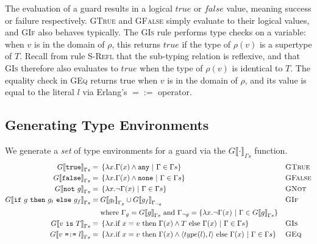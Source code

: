 \documentclass[nonacm,timestamp,manuscript]{acmart}
\newcommand{\atom}[1]{\texttt{#1}}
\newcommand{\singleton}[2]{\langle #1, #2 \rangle} %
\newcommand{\res}[1]{\texttt{#1}}
\begin{document}
The evaluation of a guard results in a logical $true$ or $false$ value, meaning
success or failure respectively. \textsc{GTrue} and \textsc{GFalse} simply
evaluate to their logical values, and \textsc{GIf} also behaves typically.
The \textsc{GIs} rule performs type checks on a variable: when $v$ is in the
domain of $\rho$, this returns $true$ if the type of $\rho(v)$ is a supertype of $T$.
Recall from rule \textsc{S-Refl} that the sub-typing relation is reflexive, and
that \textsc{GIs} therefore also evaluates to $true$ when the type of $\rho(v)$ is
identical to $T$. The equality check in \textsc{GEq} returns true when $v$ is
in the domain of $\rho$, and its value is equal to the literal $l$ via Erlang's
$=:=$ operator.

\subsection{Generating Type Environments}

\newcommand{\Gden}[2][\Gamma{}s]{{G \llbracket{} #2 \rrbracket{}}_{#1}}

\begin{definition}

We generate a \textit{set} of type environments for a guard via the
$\Gden{\cdot}$ function.
\begin{align*}
  \Gden{\res{true}
  } ={}&
         \left\{
         \lambda x . \Gamma(x) \land \atom{any}
         \ \middle|\
         \Gamma \in \Gamma{}s
         \right\}
  && \textsc{GTrue} \\
  \Gden{\res{false}
  } ={}&
         \left\{
         \lambda x . \Gamma(x) \land \atom{none}
         \ \middle|\ 
         \Gamma \in \Gamma{}s
         \right\}
  && \textsc{GFalse} \\
  \Gden{\res{not}\ g
  } ={}&
         \left\{
         \lambda x . \neg \Gamma(x)
         \ \middle|\
         \Gamma \in \Gamma{}s
         \right\}
  && \textsc{GNot} \\
  \Gden{\res{if}\ g\ \res{then}\ g_t\ \res{else}\ g_f
  } ={}& 
         \Gden[\Gamma_g]{g_t} \cup \Gden[\Gamma_{\neg g}]{g_f}
  && \textsc{GIf} \\
       & \text{where}\ \Gamma_g = \Gden{g}\ 
         \text{and}\ \Gamma_{\neg g} = \left\{ \lambda x . \neg \Gamma(x)\ \middle|\ \Gamma \in \Gden{g} \right\} \\
  \Gden{v\ \res{is}\ T
  } ={}&
         \left\{
         \lambda x . \text{if}\ x = v\ \text{then}\ \Gamma(x) \land T\ \text{else}\ \Gamma(x)
         \ \middle|\ 
         \Gamma \in \Gamma{}s
         \right\}
  && \textsc{GIs} \\
  \Gden{v\ \res{=:=}\ l
  } ={}&
         \left\{
         \lambda x . \text{if}\ x = v\ \text{then}\ \Gamma(x) \land \singleton{type(l)}{l}\ \text{else}\ \Gamma(x)
         \ \middle|\
         \Gamma \in \Gamma{}s
         \right\} 
  && \textsc{GEq}
\end{align*}
\end{definition}
\end{document}
